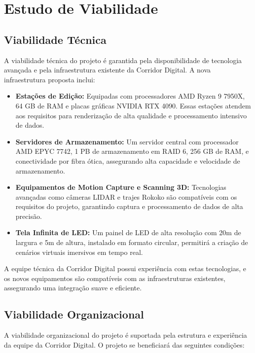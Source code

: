 
\section{Estudo de Viabilidade}

\subsection{Viabilidade Técnica}
A viabilidade técnica do projeto é garantida pela disponibilidade de tecnologia avançada e pela infraestrutura existente da Corridor Digital. A nova infraestrutura proposta inclui:

\begin{itemize}
    \item \textbf{Estações de Edição:} Equipadas com processadores AMD Ryzen 9 7950X, 64 GB de RAM e placas gráficas NVIDIA RTX 4090. Essas estações atendem aos requisitos para renderização de alta qualidade e processamento intensivo de dados.
    \item \textbf{Servidores de Armazenamento:} Um servidor central com processador AMD EPYC 7742, 1 PB de armazenamento em RAID 6, 256 GB de RAM, e conectividade por fibra ótica, assegurando alta capacidade e velocidade de armazenamento.
    \item \textbf{Equipamentos de Motion Capture e Scanning 3D:} Tecnologias avançadas como câmeras LIDAR e trajes Rokoko são compatíveis com os requisitos do projeto, garantindo captura e processamento de dados de alta precisão.
    \item \textbf{Tela Infinita de LED:} Um painel de LED de alta resolução com 20m de largura e 5m de altura, instalado em formato circular, permitirá a criação de cenários virtuais imersivos em tempo real.
\end{itemize}

A equipe técnica da Corridor Digital possui experiência com estas tecnologias, e os novos equipamentos são compatíveis com as infraestruturas existentes, assegurando uma integração suave e eficiente.

\subsection{Viabilidade Organizacional}
A viabilidade organizacional do projeto é suportada pela estrutura e experiência da equipe da Corridor Digital. O projeto se beneficiará das seguintes condições:


